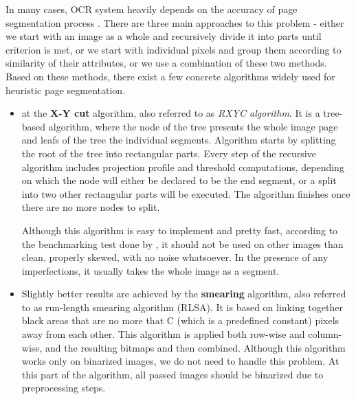 In many cases, OCR system heavily depends on the accuracy of page segmentation process \citep{pageSegmentation}. There are three main approaches \citep{segmentationBenchmark} to this problem - either we start with an image as a whole and recursively divide it into parts until criterion is met, or we start with individual pixels and group them according to similarity of their attributes, or we use a combination of these two methods. Based on these methods, there exist a few concrete algorithms widely used for heuristic page segmentation.


\begin{itemize}

\item {}  at the \textbf{X-Y cut } algorithm, also referred to as \emph{RXYC algorithm}. It is a tree-based algorithm, where the node of the tree presents the whole image page and leafs of the tree the individual segments. Algorithm starts by splitting the root of the tree into rectangular parts. Every step of the recursive algorithm includes projection profile and threshold computations, depending on which the node will either be declared to be the end segment, or a split into two other rectangular parts will be executed. The algorithm finishes once there are no more nodes to split.

Although this algorithm is easy to implement and pretty fast, according to the benchmarking test done by \citet{segmentationBenchmark}, it should not be used on other images than clean, properly skewed, with no noise whatsoever. In the presence of any imperfections, it usually takes the whole image as a segment.

\item Slightly better results are achieved by the \textbf{smearing } algorithm, also referred to as run-length smearing algorithm (RLSA). It is based on linking together black areas that are no more that C (which is a predefined constant) pixels away from each other. This algorithm is applied both row-wise and column-wise, and the resulting bitmaps and then combined. Although this algorithm works only on binarized images, we do not need to handle this problem. At this part of the algorithm, all passed images should be binarized due to preprocessing steps.


\end{itemize}
